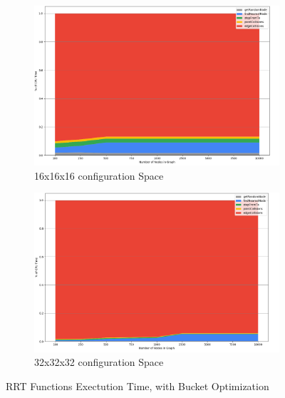 \begin{figure}[H]
\begin{center}

    \begin{subfigure}{\textwidth}
    \begin{center}
    \includegraphics[width=\linewidth,height=0.3\paperheight]{chapters/chapter2/img/profiling/16x16x16/performance2.png}
    \caption{16x16x16 \gls{configuration} Space}
    \label{subfig:16x16x16rrt2}
    \end{center}
    \end{subfigure}
    \begin{subfigure}{\textwidth}
    \begin{center}
    \includegraphics[width=\linewidth,height=0.3\paperheight]{chapters/chapter2/img/profiling/32x32x32/performance2.png}
    \caption{32x32x32 \gls{configuration} Space}
    \label{subfig:32x32x32rrt2}
    \end{center}
    \end{subfigure}
    \caption{\gls{RRT} Functions Exectution Time, with Bucket Optimization}
    \label{fig:rrt_profiling2}
\end{center}
\end{figure}